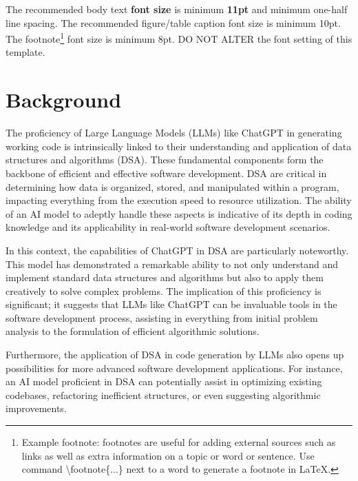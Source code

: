 The recommended body text \textbf{font size} is minimum \textbf{11pt} and minimum one-half line spacing. The recommended figure/table caption font size is minimum 10pt. The footnote\footnote{Example footnote: footnotes are useful for adding external sources such as links as well as extra information on a topic or word or sentence. Use command \textbackslash footnote\{...\} next to a word to generate a footnote in \LaTeX.} font size is minimum 8pt. DO NOT ALTER the font setting of this template.   

\section{Background}
\label{sec:into_back}



The proficiency of Large Language Models (LLMs) like ChatGPT in generating working code is intrinsically linked to their understanding and application of data structures and algorithms (DSA). These fundamental components form the backbone of efficient and effective software development. DSA are critical in determining how data is organized, stored, and manipulated within a program, impacting everything from the execution speed to resource utilization. The ability of an AI model to adeptly handle these aspects is indicative of its depth in coding knowledge and its applicability in real-world software development scenarios.

In this context, the capabilities of ChatGPT in DSA are particularly noteworthy. This model has demonstrated a remarkable ability to not only understand and implement standard data structures and algorithms but also to apply them creatively to solve complex problems. The implication of this proficiency is significant; it suggests that LLMs like ChatGPT can be invaluable tools in the software development process, assisting in everything from initial problem analysis to the formulation of efficient algorithmic solutions.

Furthermore, the application of DSA in code generation by LLMs also opens up possibilities for more advanced software development applications. For instance, an AI model proficient in DSA can potentially assist in optimizing existing codebases, refactoring inefficient structures, or even suggesting algorithmic improvements. 

